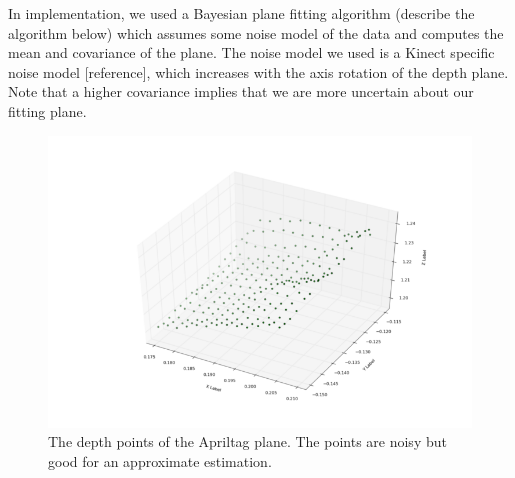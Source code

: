 In implementation, we used a Bayesian plane fitting algorithm (describe the algorithm below) which assumes some noise model of the data and computes the mean and covariance of the plane. The noise model we used is a Kinect specific noise model [reference], which increases with the axis rotation of the depth plane. Note that a higher covariance implies that we are more uncertain about our fitting plane.

\begin{figure}
\centering
\includegraphics[width=\columnwidth]{figs/depth_plane_fig}
\caption{The depth points of the Apriltag plane. The points are noisy but good for an approximate estimation.}
\label{fig:calib}
\end{figure}

